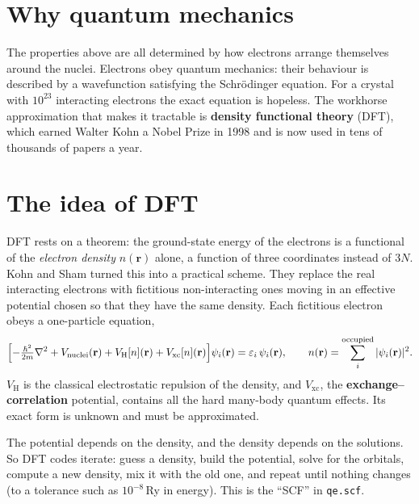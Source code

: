 \documentclass[11pt,a4paper]{report}
\newcommand{\code}[1]{\texttt{#1}}
\begin{document}
\section{Why quantum mechanics}

The properties above are all determined by how electrons arrange themselves around the
nuclei. Electrons obey quantum mechanics: their behaviour is described by a wavefunction
satisfying the Schrödinger equation. For a crystal with $10^{23}$ interacting electrons the
exact equation is hopeless. The workhorse approximation that makes it tractable is
\textbf{density functional theory} (DFT), which earned Walter Kohn a Nobel Prize in 1998 and is
now used in tens of thousands of papers a year.

\section{The idea of DFT}

DFT rests on a theorem: the ground-state energy of the electrons is a functional of the
\emph{electron density} $n(\mathbf r)$ alone, a function of three coordinates instead of
$3N$. Kohn and Sham turned this into a practical scheme. They replace the real interacting
electrons with fictitious non-interacting ones moving in an effective potential chosen so that
they have the same density. Each fictitious electron obeys a one-particle equation,
\begin{equation}
  \Bigl[-\tfrac{\hbar^2}{2m}\nabla^2 + V_\mathrm{nuclei}(\mathbf r) + V_\mathrm{H}[n](\mathbf r)
  + V_\mathrm{xc}[n](\mathbf r)\Bigr]\psi_i(\mathbf r) = \varepsilon_i\,\psi_i(\mathbf r),
  \qquad n(\mathbf r)=\sum_i^{\text{occupied}}|\psi_i(\mathbf r)|^2 .
\end{equation}
$V_\mathrm{H}$ is the classical electrostatic repulsion of the density, and $V_\mathrm{xc}$,
the \textbf{exchange--correlation} potential, contains all the hard many-body quantum effects.
Its exact form is unknown and must be approximated.

\begin{keyidea}
The potential depends on the density, and the density depends on the solutions. So DFT codes
iterate: guess a density, build the potential, solve for the orbitals, compute a new density,
mix it with the old one, and repeat until nothing changes (to a tolerance such as
$10^{-8}$\,Ry in energy). This is the ``SCF'' in \code{qe.scf}.
\end{keyidea}
\end{document}
